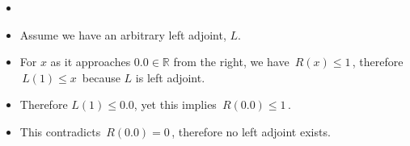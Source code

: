 \begin{itemize}
    \item  {}
    \item Assume we have an arbitrary left adjoint, $L$.
    \item For $x$ as it approaches $0.0 \in \mathbb{R}$ from the right, we have \,$R(x) \leq 1$\,, therefore \,$L(1) \leq x$\, because $L$ is left adjoint.
    \item Therefore $L(1)\leq 0.0$, yet this implies \,$R(0.0) \leq 1$\,.
    \item This contradicts \,$R(0.0)=0$\,, therefore no left adjoint exists.
  \end{itemize}